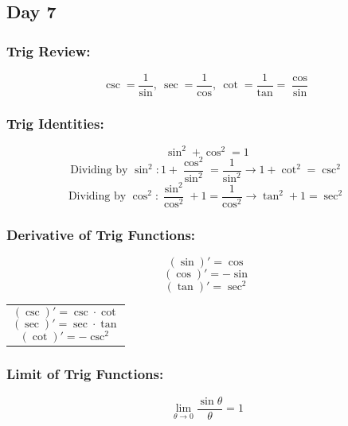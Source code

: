 \documentclass[12pt]{article}
\begin{document}
\subsection{Day 7}
\subsubsection{Trig Review:}
$$\csc = \frac{1}{\sin}, \ \sec = \frac{1}{\cos}, \ \cot = \frac{1}{\tan} = \frac{\cos}{\sin}$$
\subsubsection{Trig Identities:}
$$\sin^2 + \cos^2 = 1$$
$$\text{Dividing by }\sin^2: 1 + \frac{\cos^2}{\sin^2} = \frac{1}{\sin^2} \rightarrow{} 1 + \cot^2 = \csc^2$$
$$\text{Dividing by }\cos^2: \frac{\sin^2}{\cos^2} + 1 = \frac{1}{\cos^2} \rightarrow{} \tan^2 + 1 = \sec^2$$
\subsubsection{Derivative of Trig Functions:}
\begin{minipage}{0.5\textwidth}
    
    $$(\sin)' = \cos$$
    $$(\cos)' = -\sin$$
    $$(\tan)' = \sec^2 $$
\hfil
\end{minipage}
\begin{minipage}{0.45\textwidth}
\begin{tabular}{|p{\textwidth}}

    $$(\csc)' = \csc \cdot \cot$$
    $$(\sec)' = \sec \cdot \tan$$
    $$(\cot)' = -\csc^2 $$

\end{tabular}
\end{minipage}

\subsubsection{Limit of Trig Functions:}

$$\lim_{\theta \to 0}{\frac{\sin \theta}{\theta}} = 1$$
\end{document}
